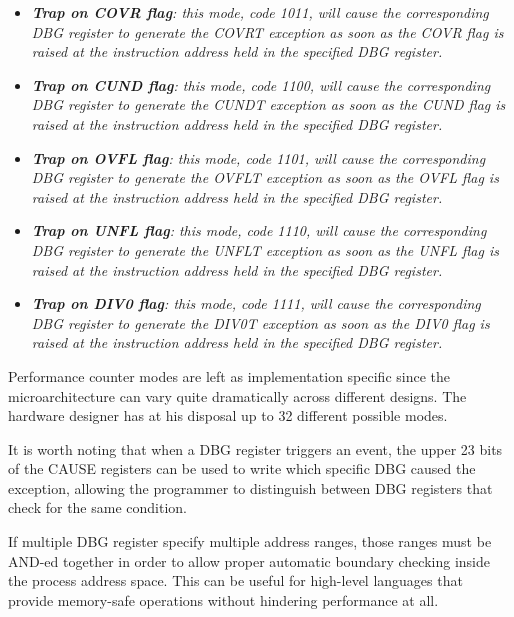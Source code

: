 \begin{itemize}
                \item \textit{\textbf{Trap on COVR flag}: this mode, code 1011, will cause the corresponding DBG register to generate the COVRT exception as soon as the COVR flag is raised at the instruction address held in the specified DBG register.}

                \item \textit{\textbf{Trap on CUND flag}: this mode, code 1100, will cause the corresponding DBG register to generate the CUNDT exception as soon as the CUND flag is raised at the instruction address held in the specified DBG register.}

                \item \textit{\textbf{Trap on OVFL flag}: this mode, code 1101, will cause the corresponding DBG register to generate the OVFLT exception as soon as the OVFL flag is raised at the instruction address held in the specified DBG register.}

                \item \textit{\textbf{Trap on UNFL flag}: this mode, code 1110, will cause the corresponding DBG register to generate the UNFLT exception as soon as the UNFL flag is raised at the instruction address held in the specified DBG register.}

                \item \textit{\textbf{Trap on DIV0 flag}: this mode, code 1111, will cause the corresponding DBG register to generate the DIV0T exception as soon as the DIV0 flag is raised at the instruction address held in the specified DBG register.}

            \end{itemize}

            Performance counter modes are left as implementation specific since the microarchitecture can vary quite dramatically across different designs. The hardware designer has at his disposal up to 32 different possible modes.

            \vspace{10pt}

            It is worth noting that when a DBG register triggers an event, the upper 23 bits of the CAUSE registers can be used to write which specific DBG caused the exception, allowing the programmer to distinguish between DBG registers that check for the same condition.

            \vspace{10pt}

            If multiple DBG register specify multiple address ranges, those ranges must be AND-ed together in order to allow proper automatic boundary checking inside the process address space. This can be useful for high-level languages that provide memory-safe operations without hindering performance at all.

